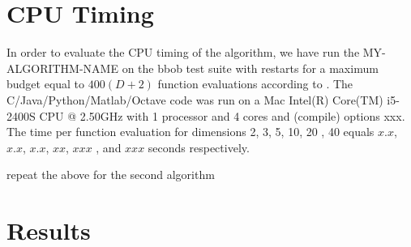\documentclass[sigconf]{acmart}
\newcommand{\change}[1]{{\color{red} #1}}
\begin{document}




\maketitle


%
%
%
\section{CPU Timing}
In order to evaluate the CPU timing of the algorithm, we have run the \change{MY-ALGORITHM-NAME} on the  \change{bbob test suite \cite{hansen2010fun}} with restarts for a maximum budget equal to \change{$400 (D + 2)$} function evaluations according to \cite{hansen2016exp}. The \change{C/Java/Python/Matlab/Octave} code was run on a \change{Mac Intel(R) Core(TM) i5-2400S CPU @ 2.50GHz} with \change{1} processor and \change{4} cores \change{and (compile) options xxx}. The time per function evaluation for dimensions 2, 3, 5, 10, 20\change{, 40} equals \change{$x.x$}, \change{$x.x$}, \change{$x.x$}, \change{$xx$}, \change{$xxx$}\change{, and $xxx$} seconds respectively. 

\change{repeat the above for the second algorithm}

\section{Results}
\end{document}
